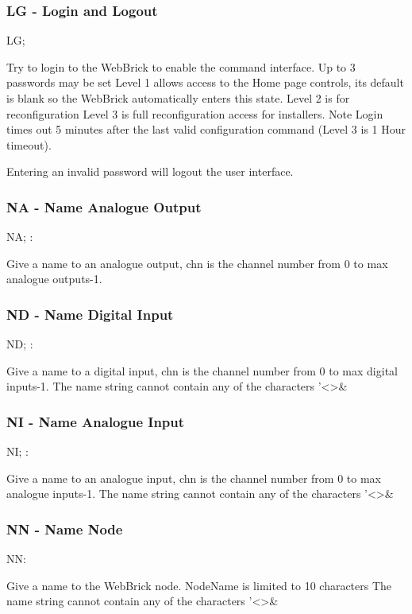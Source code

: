 \subsubsection{LG - Login and Logout}
LG;   

Try to login to the WebBrick to enable the command interface. Up to 3 passwords may be set
Level 1 allows access to the Home page controls, its default is blank so the WebBrick
automatically enters this state.
Level 2 is for reconfiguration
Level 3 is full reconfiguration access for installers.
Note Login times out 5 minutes after the last valid configuration command (Level 3 is 1 Hour timeout). 

Entering an invalid password will logout the user interface.

\subsubsection{NA - Name Analogue Output}
NA; :

Give a name to an analogue output, chn is the channel number from 0 to max analogue outputs-1.

\subsubsection{ND - Name Digital Input}
ND; :

Give a name to a digital input, chn is the channel number from 0 to max digital inputs-1.
The name string cannot contain any of the characters '\textless{}\textgreater{}\&

\subsubsection{NI - Name Analogue Input}
NI; :

Give a name to an analogue input, chn is the channel number from 0 to max analogue inputs-1.
The name string cannot contain any of the characters '\textless{}\textgreater{}\&

\subsubsection{NN - Name Node}
NN:

Give a name to the WebBrick node.
NodeName is limited to 10 characters  
The name string cannot contain any of the characters '\textless{}\textgreater{}\&

